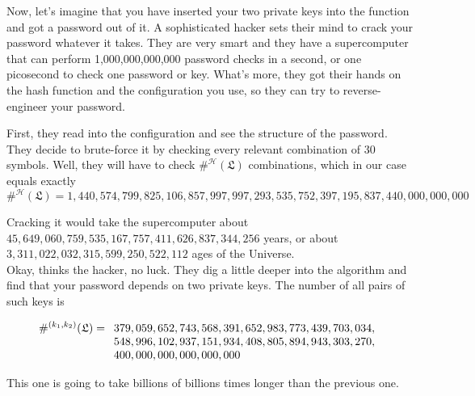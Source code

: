 \documentclass[12pt, a4paper]{article}
\renewcommand{\H}{\mathcal{H}}
\newcommand{\conf}{\mathfrak{L}}
\begin{document}
Now, let's imagine that you have inserted your two private keys into the function and got a password out of it. A sophisticated hacker sets their mind to crack your password whatever it takes. They are very smart and they have a supercomputer that can perform 1,000,000,000,000 password checks in a second, or one picosecond to check one password or key. What's more, they got their hands on the hash function and the configuration you use, so they can try to reverse-engineer your password.

First, they read into the configuration and see the structure of the password. They decide to brute-force it by checking every relevant combination of 30 symbols. Well, they will have to check $ \#^{\H}(\conf) $ combinations, which in our case equals exactly
\[ \#^{\H}(\conf) = 1,440,574,799,825,106,857,997,997,293,535,752,397,195,837,440,000,000,000 \]

Cracking it would take the supercomputer about $ 45,649,060,759,535,167,757,411,626,837,344,256 $ years, or about $ 3,311,022,032,315,599,250,522,112 $ ages of the Universe.\\

Okay, thinks the hacker, no luck. They dig a little deeper into the algorithm and find that your password depends on two private keys. The number of all pairs of such keys is

\[
\#^{(k_1,k_2)}(\conf) = \begin{array}[t]{l}
    379,059,652,743,568,391,652,983,773,439,703,034,\\
    548,996,102,937,151,934,408,805,894,943,303,270,\\
    400,000,000,000,000,000
\end{array}
\]

This one is going to take billions of billions times longer than the previous one.\\
\end{document}
